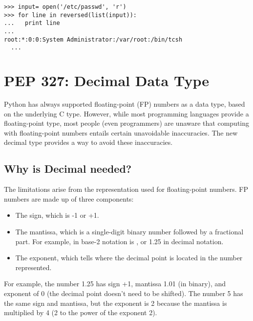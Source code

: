 \documentclass{howto}
\begin{document}
\begin{verbatim}
>>> input= open('/etc/passwd', 'r')
>>> for line in reversed(list(input)):
...   print line
... 
root:*:0:0:System Administrator:/var/root:/bin/tcsh
  ...
\end{verbatim}

\begin{seealso}

\end{seealso}


\section{PEP 327: Decimal Data Type}

Python has always supported floating-point (FP) numbers as a data
type, based on the underlying C  type.  However, while
most programming languages provide a floating-point type, most people
(even programmers) are unaware that computing with floating-point
numbers entails certain unavoidable inaccuracies.  The new decimal
type provides a way to avoid these inaccuracies.

\subsection{Why is Decimal needed?}

The limitations arise from the representation used for floating-point numbers.
FP numbers are made up of three components:

\begin{itemize}
\item The sign, which is -1 or +1.
\item The mantissa, which is a single-digit binary number  
followed by a fractional part.  For example,  in base-2 notation
is , or 1.25 in decimal notation.
\item The exponent, which tells where the decimal point is located in the number represented.  
\end{itemize}

For example, the number 1.25 has sign +1, mantissa 1.01 (in binary),
and exponent of 0 (the decimal point doesn't need to be shifted).  The
number 5 has the same sign and mantissa, but the exponent is 2
because the mantissa is multiplied by 4 (2 to the power of the exponent 2).
\end{document}
